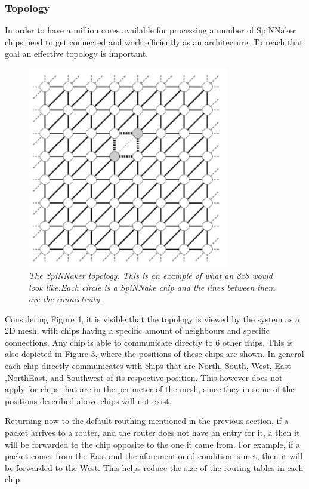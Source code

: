 \documentclass[12pt,a4paper]{article}
\begin{document}
\subsubsection{Topology}
In order to have a million cores available for processing a number of SpiNNaker chips need to get connected and work efficiently as an architecture. To reach that goal an effective topology is important.
\begin{figure}[h!]
\includegraphics[width=250pt,height=250pt,scale=2]{Pics/topology.png}
\centering
\caption{
\emph{The SpiNNaker topology\cite{navaridas2009understanding}. This is an example of what an 8x8 would look like.Each circle is a SpiNNake chip and the lines between them are the connectivity.}}
\end{figure}
\vspace{20pt}
Considering Figure 4, it is visible that the topology is viewed by the system as a 2D mesh, with chips having a specific amount of neighbours and specific connections. Any chip is able to communicate directly to 6 other chips. This is also depicted in Figure 3, where the positions of these chips are shown. In general each chip directly communicates with chips that are North, South, West, East ,NorthEast, and Southwest of its respective position. This however does not apply for chips that are in the perimeter of the mesh, since they in some of the positions described above chips will not exist\cite{furber2012overview}. 

Returning now to the default routhing mentioned in the previous section, if a packet arrives to a router, and the router does not have an entry for it, a then it will be forwarded to the chip opposite to the one it came from. For example, if a packet comes from the East and the aforementioned condition is met, then it will be forwarded to the West. This helps reduce the size of the routing tables in each chip\cite{khan2008spinnaker}.
\end{document}
